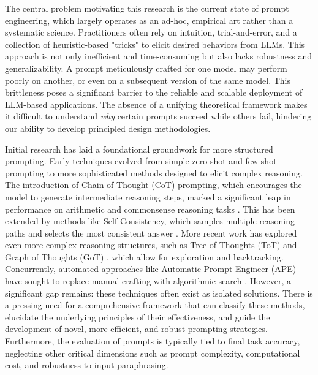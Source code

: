\documentclass{article}
\begin{document}
The central problem motivating this research is the current state of prompt engineering, which largely operates as an ad-hoc, empirical art rather than a systematic science. Practitioners often rely on intuition, trial-and-error, and a collection of heuristic-based "tricks" to elicit desired behaviors from LLMs. This approach is not only inefficient and time-consuming but also lacks robustness and generalizability. A prompt meticulously crafted for one model may perform poorly on another, or even on a subsequent version of the same model. This brittleness poses a significant barrier to the reliable and scalable deployment of LLM-based applications. The absence of a unifying theoretical framework makes it difficult to understand \textit{why} certain prompts succeed while others fail, hindering our ability to develop principled design methodologies.

Initial research has laid a foundational groundwork for more structured prompting. Early techniques evolved from simple zero-shot and few-shot prompting \cite{brown2020language} to more sophisticated methods designed to elicit complex reasoning. The introduction of Chain-of-Thought (CoT) prompting, which encourages the model to generate intermediate reasoning steps, marked a significant leap in performance on arithmetic and commonsense reasoning tasks \cite{wei2022chain}. This has been extended by methods like Self-Consistency, which samples multiple reasoning paths and selects the most consistent answer \cite{wang2022self}. More recent work has explored even more complex reasoning structures, such as Tree of Thoughts (ToT) \cite{yao2023tree} and Graph of Thoughts (GoT) \cite{besta2023graph}, which allow for exploration and backtracking. Concurrently, automated approaches like Automatic Prompt Engineer (APE) have sought to replace manual crafting with algorithmic search \cite{zhou2022large}. However, a significant gap remains: these techniques often exist as isolated solutions. There is a pressing need for a comprehensive framework that can classify these methods, elucidate the underlying principles of their effectiveness, and guide the development of novel, more efficient, and robust prompting strategies. Furthermore, the evaluation of prompts is typically tied to final task accuracy, neglecting other critical dimensions such as prompt complexity, computational cost, and robustness to input paraphrasing.
\end{document}
